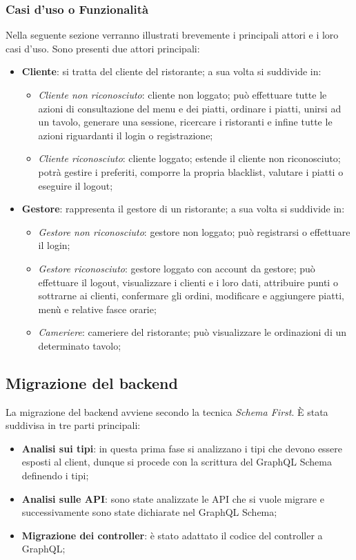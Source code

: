 \subsubsection{Casi d'uso o Funzionalità}
Nella seguente sezione verranno illustrati brevemente i principali attori e i loro casi d'uso. Sono presenti due attori principali:
\begin{itemize}
  \item \textbf{Cliente}: si tratta del cliente del ristorante; a sua volta si suddivide in:
    \begin{itemize}
      \item \textit{Cliente non riconosciuto}: cliente non loggato; può effettuare tutte le azioni di consultazione del menu e dei piatti, ordinare i piatti, unirsi ad un tavolo, generare una sessione, ricercare i ristoranti e infine tutte le azioni riguardanti il login o registrazione;
      \item \textit{Cliente riconosciuto}: cliente loggato; estende il cliente non riconosciuto; potrà gestire i preferiti, comporre la propria blacklist, valutare i piatti o eseguire il logout;
    \end{itemize}
  \item \textbf{Gestore}: rappresenta il gestore di un ristorante; a sua volta si suddivide in:
    \begin{itemize}
      \item \textit{Gestore non riconosciuto}: gestore non loggato; può registrarsi o effettuare il login;
      \item \textit{Gestore riconosciuto}: gestore loggato con account da gestore; può effettuare il logout, visualizzare i clienti e i loro dati, attribuire punti o sottrarne ai clienti, confermare gli ordini, modificare e aggiungere piatti, menù e relative fasce orarie;
      \item \textit{Cameriere}: cameriere del ristorante; può visualizzare le ordinazioni di un determinato tavolo;
    \end{itemize}
\end{itemize}
\subsection{Migrazione del backend}
La migrazione del backend avviene secondo la tecnica \textit{Schema First}. È stata suddivisa in tre parti principali:
\begin{itemize}
  \item \textbf{Analisi sui tipi}: in questa prima fase si analizzano i tipi che devono essere esposti al client, dunque si procede con la scrittura del GraphQL Schema definendo i tipi;
  \item \textbf{Analisi sulle API}: sono state analizzate le API che si vuole migrare e successivamente sono state dichiarate nel GraphQL Schema;
  \item \textbf{Migrazione dei controller}: è stato adattato il codice del controller a GraphQL;
\end{itemize}

